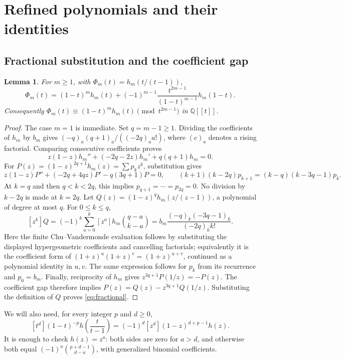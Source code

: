 \documentclass[11pt,a4paper]{amsart}
\newtheorem{lemma}[theorem]{Lemma}
\theoremstyle{remark}\newtheorem{remark}[theorem]{Remark}
\numberwithin{equation}{section}
\newcommand{\Q}{\mathbb Q}
\begin{document}
\section{Refined polynomials and their identities}\label{sec:prelim}
\subsection{Fractional substitution and the coefficient gap}
\begin{lemma}\label{lem:fractional}
For $m\ge1$, with $\Phi_m(t)=h_m(t/(t-1))$,
\begin{equation}\label{eq:fractional}
 \Phi_m(t)=(1-t)^m h_m(t)
 +(-1)^{m-1}\frac{t^{2m-1}}{(1-t)^{m-1}}h_m(1-t).
\end{equation}
Consequently $\Phi_m(t)\equiv(1-t)^mh_m(t)\pmod{t^{2m-1}}$ in $\Q[[t]]$.
\end{lemma}
\begin{proof}
The case $m=1$ is immediate. Set $q=m-1\ge1$. Dividing the coefficients of $h_m$ by $b_m$ gives
$(-q)_a(q+1)_a/((-2q)_a a!)$, where $(c)_a$ denotes a rising factorial. Comparing consecutive coefficients proves
\[
 z(1-z)h_m''+(-2q-2z)h_m'+q(q+1)h_m=0.
\]
For $P(z)=(1-z)^{2q+1}h_m(z)=\sum p_kz^k$, substitution gives
\[
 z(1-z)P''+(-2q+4qz)P'-q(3q+1)P=0,
 \qquad (k+1)(k-2q)p_{k+1}=(k-q)(k-3q-1)p_k.
\]
At $k=q$ and then $q<k<2q$, this implies $p_{q+1}=\cdots=p_{2q}=0$. No division by $k-2q$ is made at $k=2q$.
Let $Q(z)=(1-z)^qh_m(z/(z-1))$, a polynomial of degree at most $q$. For $0\le k\le q$,
\[
 [z^k]Q=(-1)^k\sum_{a=0}^k[z^a]h_m\binom{q-a}{k-a}
 =b_m\frac{(-q)_k(-3q-1)_k}{(-2q)_k k!}.
\]
Here the finite Chu--Vandermonde evaluation follows by substituting the displayed hypergeometric coefficients and cancelling factorials; equivalently it is the coefficient form of $(1+z)^u(1+z)^v=(1+z)^{u+v}$, continued as a polynomial identity in $u,v$. The same expression follows for $p_k$ from its recurrence and $p_0=b_m$. Finally, reciprocity of $h_m$ gives $z^{3q+1}P(1/z)=-P(z)$. The coefficient gap therefore implies
$P(z)=Q(z)-z^{3q+1}Q(1/z)$. Substituting the definition of $Q$ proves \eqref{eq:fractional}.
\end{proof}
We will also need, for every integer $p$ and $d\ge0$,
\begin{equation}\label{eq:coeff-transform}
 [t^d](1-t)^{-p}h\left(\frac t{t-1}\right)
 =(-1)^d[z^d](1-z)^{d+p-1}h(z).
\end{equation}
It is enough to check $h(z)=z^a$: both sides are zero for $a>d$, and otherwise both equal $(-1)^a\binom{p+d-1}{d-a}$, with generalized binomial coefficients.
\end{document}
